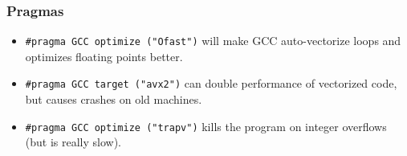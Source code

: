   \subsubsection{Pragmas}
    \begin{itemize}
      \item \lstinline{#pragma GCC optimize ("Ofast")} will make GCC auto-vectorize loops and optimizes floating points better.
      \item \lstinline{#pragma GCC target ("avx2")} can double performance of vectorized code, but causes crashes on old machines.
      \item \lstinline{#pragma GCC optimize ("trapv")} kills the program on integer overflows (but is really slow).
    \end{itemize}
